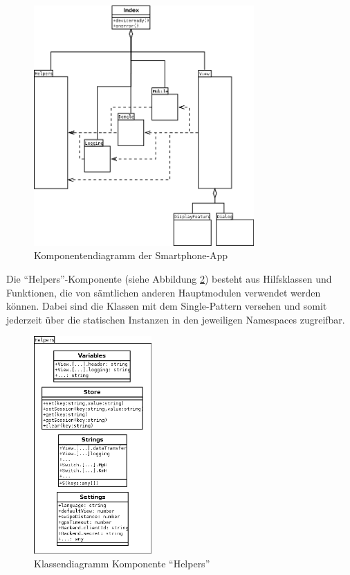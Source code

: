 \begin{figure}[H]
  \begin{center}
    \includegraphics[width=0.75\textwidth]{./img/App_Komponentendiagramm}
    \caption{Komponentendiagramm der Smartphone-App}
    \label{fig:appKomponentendiagramm}
  \end{center}
\end{figure}

Die \enquote{Helpers}-Komponente (siehe Abbildung \ref{fig:appKlassendiagrammHelpers}) besteht aus Hilfsklassen und Funktionen, die von sämtlichen anderen Hauptmodulen verwendet werden können. Dabei sind die Klassen mit dem Single-Pattern versehen und somit jederzeit über die statischen Instanzen in den jeweiligen Namespaces zugreifbar. 

\begin{figure}
  \begin{center}
    \includegraphics[width=0.4\textwidth]{./img/App_Klassendiagramm_Helpers}
    \caption{Klassendiagramm Komponente \enquote{Helpers}}
    \label{fig:appKlassendiagrammHelpers}
  \end{center}
\end{figure}\leavevmode

